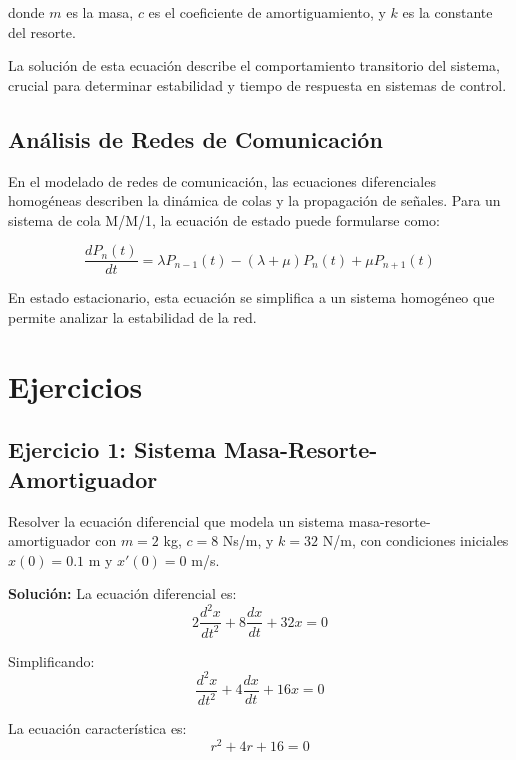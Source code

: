 \documentclass[12pt]{article}
\begin{document}
donde $m$ es la masa, $c$ es el coeficiente de amortiguamiento, y $k$ es la constante del resorte.

La solución de esta ecuación describe el comportamiento transitorio del sistema, crucial para determinar estabilidad y tiempo de respuesta en sistemas de control.

\subsection{Análisis de Redes de Comunicación}

En el modelado de redes de comunicación, las ecuaciones diferenciales homogéneas describen la dinámica de colas y la propagación de señales. Para un sistema de cola M/M/1, la ecuación de estado puede formularse como:

\begin{equation}
    \frac{dP_n(t)}{dt} = \lambda P_{n-1}(t) - (\lambda + \mu) P_n(t) + \mu P_{n+1}(t)
\end{equation}

En estado estacionario, esta ecuación se simplifica a un sistema homogéneo que permite analizar la estabilidad de la red.

\section{Ejercicios}

\subsection{Ejercicio 1: Sistema Masa-Resorte-Amortiguador}

Resolver la ecuación diferencial que modela un sistema masa-resorte-amortiguador con $m = 2$ kg, $c = 8$ Ns/m, y $k = 32$ N/m, con condiciones iniciales $x(0) = 0.1$ m y $x'(0) = 0$ m/s.

\textbf{Solución:}
La ecuación diferencial es:
\begin{equation}
    2 \frac{d^2 x}{dt^2} + 8 \frac{dx}{dt} + 32x = 0
\end{equation}

Simplificando:
\begin{equation}
    \frac{d^2 x}{dt^2} + 4 \frac{dx}{dt} + 16x = 0
\end{equation}

La ecuación característica es:
\begin{equation}
    r^2 + 4r + 16 = 0
\end{equation}
\end{document}
